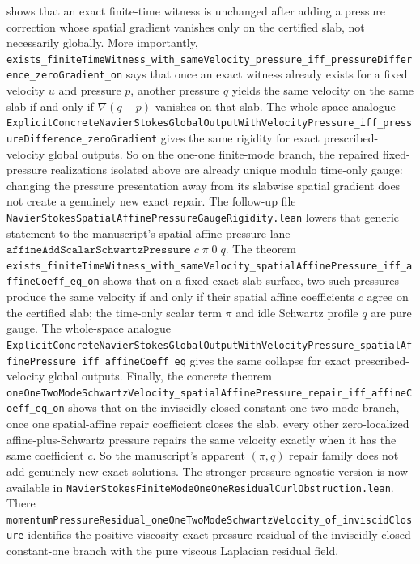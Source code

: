 \documentclass[11pt]{article}
\theoremstyle{remark}
\begin{document}
shows that an exact finite-time witness is unchanged after adding a pressure
correction whose spatial gradient vanishes only on the certified slab, not
necessarily globally.  More importantly,
\texttt{exists\_finiteTimeWitness\_with\_sameVelocity\_pressure\_iff\_pressureDifference\_zeroGradient\_on}
says that once an exact witness already exists for a fixed velocity \(u\) and
pressure \(p\), another pressure \(q\) yields the same velocity on the same
slab if and only if \(\nabla (q-p)\) vanishes on that slab.  The whole-space
analogue
\texttt{ExplicitConcreteNavierStokesGlobalOutputWithVelocityPressure\_iff\_pressureDifference\_zeroGradient}
gives the same rigidity for exact prescribed-velocity global outputs.  So on
the one-one finite-mode branch, the repaired fixed-pressure realizations
isolated above are already unique modulo time-only gauge: changing the
pressure presentation away from its slabwise spatial gradient does not create
a genuinely new exact repair.
The follow-up file
\texttt{NavierStokesSpatialAffinePressureGaugeRigidity.lean} lowers that
generic statement to the manuscript's spatial-affine pressure lane
\(\texttt{affineAddScalarSchwartzPressure}\; c\; \pi\; 0\; q\).  The theorem
\texttt{exists\_finiteTimeWitness\_with\_sameVelocity\_spatialAffinePressure\_iff\_affineCoeff\_eq\_on}
shows that on a fixed exact slab surface, two such pressures produce the same
velocity if and only if their spatial affine coefficients \(c\) agree on the
certified slab; the time-only scalar term \(\pi\) and idle Schwartz profile
\(q\) are pure gauge.  The whole-space analogue
\texttt{ExplicitConcreteNavierStokesGlobalOutputWithVelocityPressure\_spatialAffinePressure\_iff\_affineCoeff\_eq}
gives the same collapse for exact prescribed-velocity global outputs.  Finally,
the concrete theorem
\texttt{oneOneTwoModeSchwartzVelocity\_spatialAffinePressure\_repair\_iff\_affineCoeff\_eq\_on}
shows that on the inviscidly closed constant-one two-mode branch, once one
spatial-affine repair coefficient closes the slab, every other zero-localized
affine-plus-Schwartz pressure repairs the same velocity exactly when it has the
same coefficient \(c\).  So the manuscript's apparent \((\pi,q)\) repair family
does not add genuinely new exact solutions.
The stronger pressure-agnostic version is now available in
\texttt{NavierStokesFiniteModeOneOneResidualCurlObstruction.lean}.  There
\texttt{momentumPressureResidual\_oneOneTwoModeSchwartzVelocity\_of\_inviscidClosure}
identifies the positive-viscosity exact pressure residual of the inviscidly
closed constant-one branch with the pure viscous Laplacian residual field.
\end{document}
